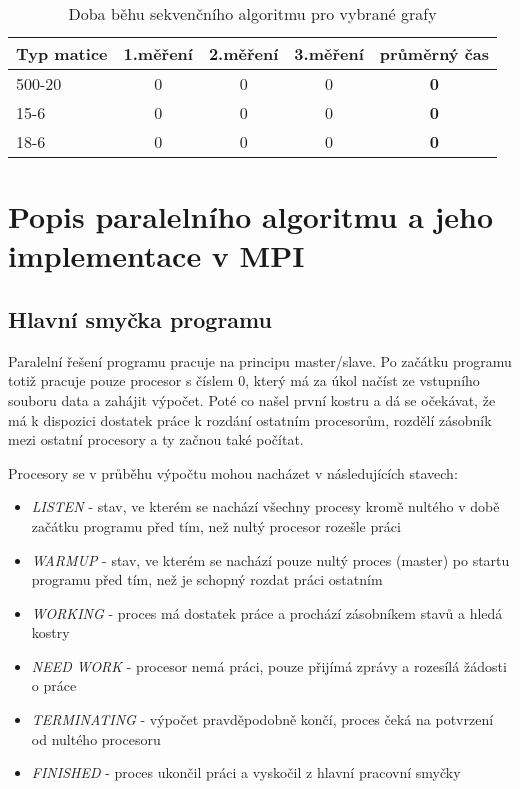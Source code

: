 \documentclass[]{article}
\begin{document}
\begin{table}[ht]
\centering
\begin{tabular}{|l|c|c|c|c|}
\hline \textbf{Typ matice} & \textbf{1.měření} & \textbf{2.měření} & \textbf{3.měření} & \textbf{průměrný čas} \\
\hline 
\hline 500-20 & 0 & 0 & 0 & \textbf{0} \\ 
\hline 15-6 & 0 & 0 & 0 & \textbf{0} \\ 
\hline 18-6 & 0 & 0 & 0 & \textbf{0} \\ 
\hline 
\end{tabular}
\caption{Doba běhu sekvenčního algoritmu pro vybrané grafy}
\label{sekvencni_test}	
\end{table}

\section{Popis paralelního algoritmu a jeho implementace v MPI}

\subsection{Hlavní smyčka programu}
Paralelní řešení programu pracuje na principu master/slave. Po začátku programu totiž pracuje pouze procesor s číslem 0, který má za úkol načíst ze vstupního souboru data a zahájit výpočet. Poté co našel první kostru a dá se očekávat, že má k dispozici dostatek práce k rozdání ostatním procesorům, rozdělí zásobník mezi ostatní procesory a ty začnou také počítat.

Procesory se v průběhu výpočtu mohou nacházet v následujících stavech:
\begin{itemize}
  \item \textit{LISTEN} - stav, ve kterém se nachází všechny procesy kromě nultého v době začátku programu před tím, než nultý procesor rozešle práci
  \item \textit{WARMUP} - stav, ve kterém se nachází pouze nultý proces (master) po startu programu před tím, než je schopný rozdat práci ostatním
  \item \textit{WORKING} - proces má dostatek práce a prochází zásobníkem stavů a hledá kostry
  \item \textit{NEED WORK} - procesor nemá práci, pouze přijímá zprávy a rozesílá žádosti o práce
  \item \textit{TERMINATING} - výpočet pravděpodobně končí, proces čeká na potvrzení od nultého procesoru
  \item \textit{FINISHED} - proces ukončil práci a vyskočil z hlavní pracovní smyčky
\end{itemize}
\end{document}
